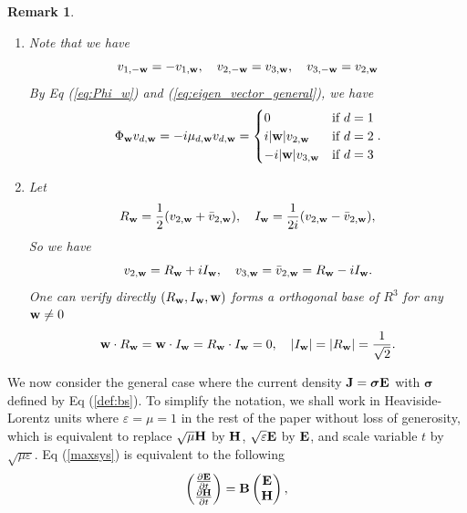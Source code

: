 \documentclass[10pt,reqno]{amsart}
\newcommand{\bS}{\boldsymbol{\sigma}}
\def\eps{\varepsilon}
\renewcommand{\(}{\left(}
\renewcommand{\)}{\right)}
\newcommand{\bw}{{\bf w}}
\newcommand{\HH}{{\bf H}}
\newcommand{\EE}{{\bf E}}
\newcommand{\BB}{{\bf B}}
\newcommand{\bJ}{\mathbf{J}}
\newtheorem{rem}[theo]{Remark}
\numberwithin{equation}{section}
\begin{document}
\begin{rem}
	\begin{enumerate}
		\item Note that we have
		\[
		v_{1,-\bw} = -v_{1,\bw},  \quad v_{2,-\bw} = v_{3,\bw}, \quad v_{3,-\bw} = v_{2,\bw} 
		\]
		By Eq (\ref{eq:Phi_w}) and (\ref{eq:eigen_vector_general}), we have
		\begin{equation}\label{eq:Phi_w_case}
			\Phi_{\bw} v_{d,\bw} = -i\mu_{d,\bw} v_{d,\bw} = \begin{cases} 
				0 & \text{if } d=1 \\ 
				i|\bw| v_{2,\bw}  & \text{if } d=2 \\
				-i |\bw|  v_{3,\bw} & \text{if } d= 3
			\end{cases}.
		\end{equation}
		\item 
		Let
		\[
		R_{\bw} = \frac12 (v_{2,\bw} + \bar{v}_{2,\bw}),  \quad I_{\bw} = \frac1{2i} (v_{2,\bw} - \bar{v}_{2,\bw}),
		\]
		So we have
		\[
		v_{2,\bw} = R_{\bw} + iI_{\bw}, \quad v_{3,\bw} = \bar{v}_{2,\bw} = R_{\bw} - iI_{\bw}.
		\]
		One can verify directly $(R_{\bw},I_{\bw},\bw)$ forms a orthogonal base of $R^3$ for any $\bw\neq 0$ 
		\[
		\bw\cdot R_{\bw} =\bw\cdot I_{\bw}=R_{\bw}\cdot I_{\bw}=0, \quad |I_{\bw}| = |R_{\bw}| = \frac1{\sqrt 2}.
		\]
	\end{enumerate}
\end{rem}
We now consider the general case where the current density $\bJ = \bS \EE$ with $\bS$ defined by Eq (\ref{def:bs}).  To simplify the notation, we shall work in Heaviside-Lorentz units where $\eps=\mu= 1$ in the rest of the paper without loss of generosity, which is equivalent to replace $\sqrt \mu \HH$  by $\HH$,  $\sqrt{\eps}  \EE$ by $\EE$, and scale variable $t$ by $\sqrt{\mu\eps}$.  Eq (\ref{maxsys}) is equivalent to the following
\begin{equation}\label{eq:D}
	\begin{pmatrix}
		\frac{\partial {\EE}}{\partial t}   \\
		\frac{\partial{  \HH}}{\partial t}
	\end{pmatrix}
	=\BB \begin{pmatrix}
		\EE  \\
		\HH
	\end{pmatrix},   
\end{equation}
\end{document}
